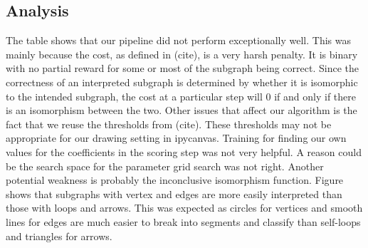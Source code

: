\subsection{Analysis}

The table shows that our pipeline did not perform exceptionally well. This was mainly because the cost, as defined in (cite), is a very harsh penalty. It is binary with no partial reward for some or most of the subgraph being correct. Since the correctness of an interpreted subgraph is determined by whether it is isomorphic to the intended subgraph, the cost at a particular step will 0 if and only if there is an isomorphism between the two. Other issues that affect our algorithm is the fact that we reuse the thresholds from (cite). These thresholds may not be appropriate for our drawing setting in ipycanvas. Training for finding our own values for the coefficients in the scoring step was not very helpful. A reason could be the search space for the parameter grid search was not right. Another potential weakness is probably the inconclusive isomorphism function. Figure shows that subgraphs with vertex and edges are more easily interpreted than those with loops and arrows. This was expected as circles for vertices and smooth lines for edges are much easier to break into segments and classify than self-loops and triangles for arrows.
